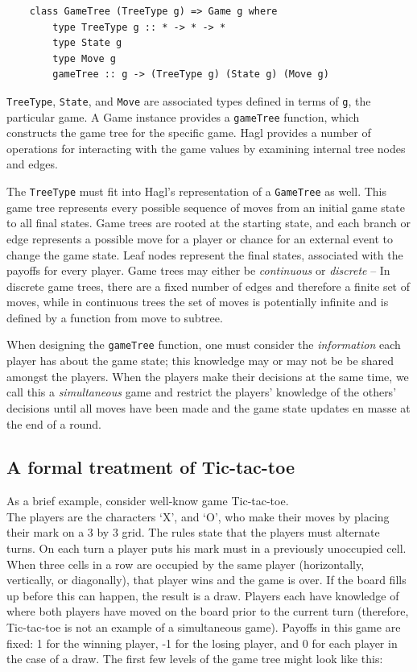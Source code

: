 \documentclass{article}
\begin{document}
\begin{verbatim}
    class GameTree (TreeType g) => Game g where
        type TreeType g :: * -> * -> *
        type State g
        type Move g
        gameTree :: g -> (TreeType g) (State g) (Move g)
\end{verbatim}

\texttt{TreeType}, \texttt{State}, and \texttt{Move} are associated
types defined in terms of \texttt{g}, the particular game. A Game
instance provides a \texttt{gameTree} function, which constructs the
game tree for the specific game. Hagl provides a number of operations
for interacting with the game values by examining internal tree nodes
and edges.

The \texttt{TreeType} must fit into Hagl's representation of a
\texttt{GameTree} as well. This game tree represents every possible
sequence of moves from an initial game state to all final states. Game
trees are rooted at the starting state, and each branch or edge
represents a possible move for a player or chance for an external event
to change the game state. Leaf nodes represent the final states,
associated with the payoffs for every player. Game trees may either be
\emph{continuous} or \emph{discrete} -- In discrete game trees, there
are a fixed number of edges and therefore a finite set of moves, while
in continuous trees the set of moves is potentially infinite and is
defined by a function from move to subtree.

When designing the \texttt{gameTree} function, one must consider the
\emph{information} each player has about the game state; this knowledge
may or may not be be shared amongst the players. When the players make
their decisions at the same time, we call this a \emph{simultaneous}
game and restrict the players' knowledge of the others' decisions until
all moves have been made and the game state updates en masse at the end
of a round.

\subsection{A formal treatment of
Tic-tac-toe}

As a brief example, consider well-know game Tic-tac-toe.\\The players
are the characters `X', and `O', who make their moves by placing their
mark on a 3 by 3 grid. The rules state that the players must alternate
turns. On each turn a player puts his mark must in a previously
unoccupied cell. When three cells in a row are occupied by the same
player (horizontally, vertically, or diagonally), that player wins and
the game is over. If the board fills up before this can happen, the
result is a draw. Players each have knowledge of where both players have
moved on the board prior to the current turn (therefore, Tic-tac-toe is
not an example of a simultaneous game). Payoffs in this game are fixed:
1 for the winning player, -1 for the losing player, and 0 for each
player in the case of a draw. The first few levels of the game tree
might look like this:
\end{document}
